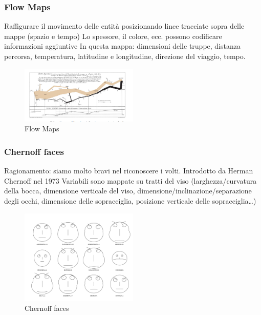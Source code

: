 \subsubsection{Flow Maps}

Raffigurare il movimento delle entità posizionando linee tracciate sopra delle mappe (spazio e tempo)
Lo spessore, il colore, ecc. possono codificare informazioni aggiuntive
In questa mappa: dimensioni delle truppe, distanza percorsa, temperatura, latitudine e longitudine, direzione del viaggio, tempo.
\begin{figure}[H]
    \centering
    \includegraphics[width=0.5\textwidth]{images/FlowMaps.png}
    \caption{Flow Maps}
    \label{fig:immagine}
\end{figure}
\subsubsection{Chernoff faces}
Ragionamento: siamo molto bravi nel riconoscere i volti.
Introdotto da Herman Chernoff nel 1973
Variabili sono mappate su tratti del viso
(larghezza/curvatura della bocca, dimensione verticale del viso, dimensione/inclinazione/separazione degli occhi, dimensione delle sopracciglia, posizione verticale delle sopracciglia…)
\begin{figure}[H]
    \centering
    \includegraphics[width=0.5\textwidth]{images/Chernofffaces.png} 
    \caption{Chernoff faces}
    \label{fig:immagine}
\end{figure}
